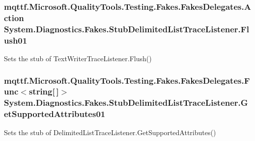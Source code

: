 \hypertarget{class_system_1_1_diagnostics_1_1_fakes_1_1_stub_delimited_list_trace_listener_ab11a4889164707f23679a7788defab10}{
\subsubsection[{Flush01}]{\setlength{\rightskip}{0pt plus 5cm}mqttf.\-Microsoft.\-Quality\-Tools.\-Testing.\-Fakes.\-Fakes\-Delegates.\-Action System.\-Diagnostics.\-Fakes.\-Stub\-Delimited\-List\-Trace\-Listener.\-Flush01}}\label{class_system_1_1_diagnostics_1_1_fakes_1_1_stub_delimited_list_trace_listener_ab11a4889164707f23679a7788defab10}


Sets the stub of Text\-Writer\-Trace\-Listener.\-Flush()

\hypertarget{class_system_1_1_diagnostics_1_1_fakes_1_1_stub_delimited_list_trace_listener_a294fd3d3c64c5c344f17861ba23c72fa}{
\subsubsection[{Get\-Supported\-Attributes01}]{\setlength{\rightskip}{0pt plus 5cm}mqttf.\-Microsoft.\-Quality\-Tools.\-Testing.\-Fakes.\-Fakes\-Delegates.\-Func$<$string\mbox{[}$\,$\mbox{]}$>$ System.\-Diagnostics.\-Fakes.\-Stub\-Delimited\-List\-Trace\-Listener.\-Get\-Supported\-Attributes01}}\label{class_system_1_1_diagnostics_1_1_fakes_1_1_stub_delimited_list_trace_listener_a294fd3d3c64c5c344f17861ba23c72fa}


Sets the stub of Delimited\-List\-Trace\-Listener.\-Get\-Supported\-Attributes()

